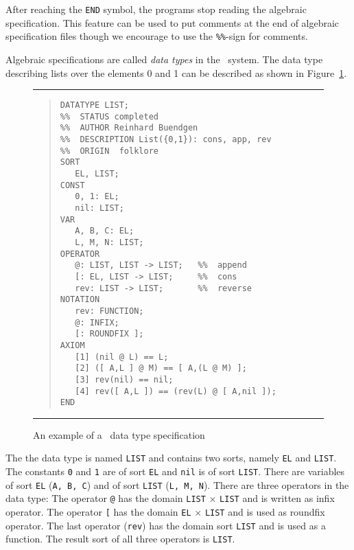 After reaching the {\tt END} symbol, the programs stop reading the
algebraic specification. This feature can be used to put comments at
the end of algebraic specification files though we encourage to use the
\verb/%%/-sign for comments.

Algebraic specifications are called {\em data types} in the \redux\ 
system.  The data type describing lists over the elements 0 and 1 can
be described as shown in Figure~\ref{fi:exa}.

\begin{figure}[htbp]
\begin{center}
\noindent
\rule{\textwidth}{0.6pt}

\begin{minipage}{5.9in} %
\begin{quote}
\begin{verbatim}
DATATYPE LIST;
%%  STATUS completed
%%  AUTHOR Reinhard Buendgen
%%  DESCRIPTION List({0,1}): cons, app, rev
%%  ORIGIN  folklore
SORT
   EL, LIST;
CONST
   0, 1: EL;
   nil: LIST;
VAR
   A, B, C: EL;
   L, M, N: LIST;
OPERATOR
   @: LIST, LIST -> LIST;   %%  append 
   [: EL, LIST -> LIST;     %%  cons
   rev: LIST -> LIST;       %%  reverse
NOTATION
   rev: FUNCTION;
   @: INFIX;
   [: ROUNDFIX ];
AXIOM
   [1] (nil @ L) == L;
   [2] ([ A,L ] @ M) == [ A,(L @ M) ];
   [3] rev(nil) == nil;
   [4] rev([ A,L ]) == (rev(L) @ [ A,nil ]);
END
\end{verbatim}
\end{quote}
\end{minipage}
 
\noindent
\rule{\textwidth}{0.6pt}
\end{center}
\caption{An example of a \redux\  data type specification} \label{fi:exa}
\end{figure}
The the data type is named {\tt LIST} and contains two sorts,
namely {\tt EL} and {\tt LIST}. The constants {\tt 0} and {\tt 1}
are of sort {\tt EL} and {\tt nil} is of sort {\tt LIST}.
There are variables of sort {\tt EL} ({\tt A, B, C}) and of sort {\tt LIST}
({\tt L, M, N}).
There are three operators in the data type:
The operator {\tt @} has the domain {\tt LIST} $\times$ {\tt LIST}
and is written as infix operator.
The operator {\tt [} has the domain {\tt EL} $\times$ {\tt LIST} and
is used as roundfix operator.
The last operator ({\tt rev}) has the domain sort {\tt LIST}
and is used as a function. 
The result sort of all three operators is {\tt LIST}.


